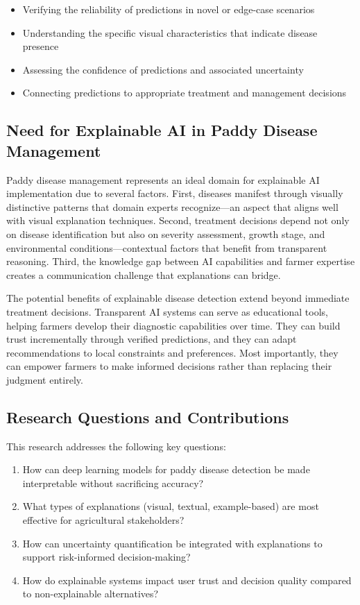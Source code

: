 \begin{itemize}
    \item Verifying the reliability of predictions in novel or edge-case scenarios
    \item Understanding the specific visual characteristics that indicate disease presence
    \item Assessing the confidence of predictions and associated uncertainty
    \item Connecting predictions to appropriate treatment and management decisions
\end{itemize}

\subsection{Need for Explainable AI in Paddy Disease Management}

Paddy disease management represents an ideal domain for explainable AI implementation due to several factors. First, diseases manifest through visually distinctive patterns that domain experts recognize—an aspect that aligns well with visual explanation techniques. Second, treatment decisions depend not only on disease identification but also on severity assessment, growth stage, and environmental conditions—contextual factors that benefit from transparent reasoning. Third, the knowledge gap between AI capabilities and farmer expertise creates a communication challenge that explanations can bridge.

The potential benefits of explainable disease detection extend beyond immediate treatment decisions. Transparent AI systems can serve as educational tools, helping farmers develop their diagnostic capabilities over time. They can build trust incrementally through verified predictions, and they can adapt recommendations to local constraints and preferences. Most importantly, they can empower farmers to make informed decisions rather than replacing their judgment entirely.

\subsection{Research Questions and Contributions}

This research addresses the following key questions:

\begin{enumerate}
    \item How can deep learning models for paddy disease detection be made interpretable without sacrificing accuracy?
    \item What types of explanations (visual, textual, example-based) are most effective for agricultural stakeholders?
    \item How can uncertainty quantification be integrated with explanations to support risk-informed decision-making?
    \item How do explainable systems impact user trust and decision quality compared to non-explainable alternatives?
\end{enumerate}

